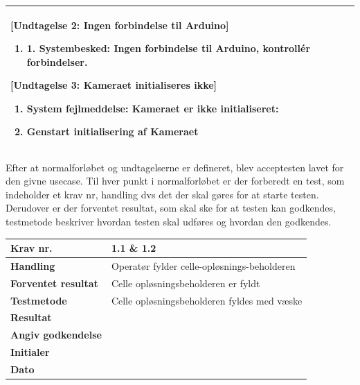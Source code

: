 \begin{center}
\begin{longtable}{ | m{4cm} | m{8cm}| }
			[Undtagelse 2: Ingen forbindelse til Arduino]
			
			\begin{enumerate}
			\item 1.	Systembesked: Ingen forbindelse til Arduino, kontrollér forbindelser.
			\end{enumerate} 
	
			[Undtagelse 3: Kameraet initialiseres ikke]
			
			\begin{enumerate}
			\item System fejlmeddelse: Kameraet er ikke initialiseret:
			\item Genstart initialisering af Kameraet
			\end{enumerate} \\
			\hline
		\end{longtable}
	\end{center}

Efter at normalforløbet og undtagelserne er defineret, blev acceptesten lavet for den givne usecase. Til hver punkt i normalforløbet er der forberedt en test, som indeholder et krav nr, handling dvs det der skal gøres for at starte testen. Derudover er der forventet resultat, som skal ske for at testen kan godkendes, testmetode beskriver hvordan testen skal udføres og hvordan den godkendes.

\begin{center}
		\begin{longtable}{ | m{4cm}| m{8.5cm}|} 
			\hline
			\textbf{Krav nr.} & 1.1 \& 1.2    \\ 
			\hline
			\textbf{Handling} &  Operatør fylder celle-opløsnings-beholderen   \\
			\hline
			\textbf{Forventet resultat} &  Celle opløsningsbeholderen er fyldt  \\
			\hline
			\textbf{Testmetode}  &  Celle opløsningsbeholderen fyldes med væske  \\
			\hline
			\textbf{Resultat}  &    \\
			\hline
			\textbf{Angiv godkendelse} &     \\
			\hline
			\textbf{Initialer} &     \\
			\hline
			\textbf{Dato} &    \\
			\hline
		\end{longtable}
	\end{center}
	
